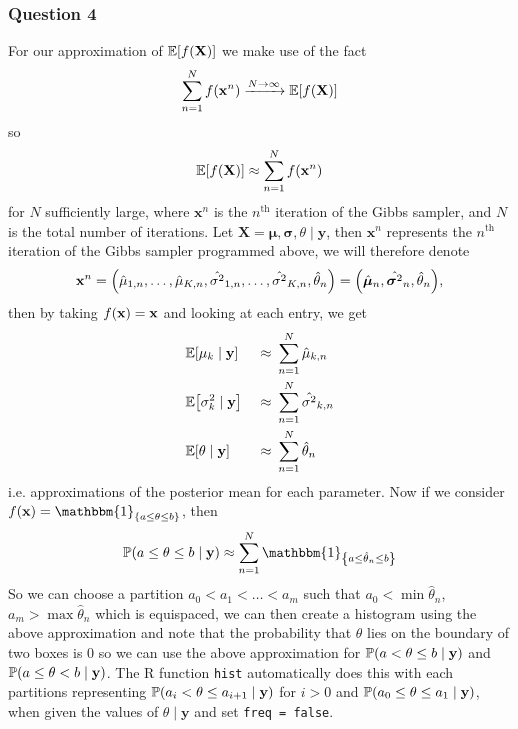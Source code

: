 \documentclass[11pt]{article} %
\let\originalleft\left
\let\originalright\right
\renewcommand{\left}{\mathopen{}\mathclose\bgroup\originalleft}
\renewcommand{\right}{\aftergroup\egroup\originalright}
\begin{document}
\subsubsection*{Question 4}
For our approximation of $\mathbb{E}\left[f\left(\mathbf{X}\right)\right]$ we make use of the fact
\begin{equation*}
	\sum_{n=1}^{N}{f\left(\mathbf{x}^n\right)} \xrightarrow{N \to \infty} \mathbb{E}\left[f\left(\mathbf{X}\right)\right]
\end{equation*}
so
\begin{equation}
	\mathbb{E}\left[f\left(\mathbf{X}\right)\right] \approx \sum_{n=1}^{N}{f\left(\mathbf{x}^n\right)} \label{eq:1}
\end{equation}
for $N$ sufficiently large, where $\mathbf{x}^n$ is the $n^{\text{th}}$ iteration of the Gibbs sampler, and $N$ is the total number of iterations. Let $\mathbf{X} = \boldsymbol{\mu}, \boldsymbol{\sigma}, \theta \mid \mathbf{y}$, then $\mathbf{x}^n$ represents the $n^{\text{th}}$ iteration of the Gibbs sampler programmed above, we will therefore denote 
$$\mathbf{x}^n = \left(\hat{\mu}_{1, n},\ldots , \hat{\mu}_{K, n}, \hat{\sigma^2}_{1, n},\ldots , \hat{\sigma^2}_{K, n}, \hat{\theta}_n\right) = \left(\hat{\boldsymbol{\mu}}_n, \hat{\boldsymbol{\sigma}^2}_n, \hat{\theta}_n\right),$$
then by taking $f\left(\mathbf{x}\right) = \mathbf{x}$ and looking at each entry, we get
\begin{alignat*}{2}
	& \mathbb{E}\left[\mu_k\mid\mathbf{y}\right] &\ \approx\ & \sum_{n=1}^{N}{\hat{\mu}_{k, n}} \\
	& \mathbb{E}\left[\sigma^2_k\mid\mathbf{y}\right] &\ \approx\ & \sum_{n=1}^{N}{\hat{\sigma^2}_{k, n}} \\
	& \mathbb{E}\left[\theta\mid\mathbf{y}\right] &\ \approx\ & \sum_{n=1}^{N}{\hat{\theta}_n} 
\end{alignat*}
i.e. approximations of the posterior mean for each parameter. Now if we consider $f\left(\mathbf{x}\right) = \mathbbm{1}_{\left\{a \leq \theta \leq b \right\}}$, then
$$\mathbb{P}\left(a \leq \theta \leq b \mid \mathbf{y} \right) \approx \sum_{n=1}^{N}{\mathbbm{1}_{\left\{a \leq \hat{\theta}_n \leq b \right\}}}$$
So we can choose a partition $a_0 < a_1 < \ldots < a_m$ such that $a_0 < \min{\hat{\theta}_n}$, $a_m > \max{\hat{\theta}_n}$ which is equispaced, we can then create a histogram using the above approximation and note that the probability that $\theta$ lies on the boundary of two boxes is $0$ so we can use the above approximation for $\mathbb{P}\left(a < \theta \leq b \mid \mathbf{y} \right)$ and $\mathbb{P}\left(a \leq \theta < b \mid \mathbf{y} \right)$. The R function \verb|hist| automatically does this with each partitions representing $ \mathbb{P}\left(a_i < \theta \leq a_{i+1} \mid \mathbf{y} \right) $ for $i > 0$ and $ \mathbb{P}\left(a_0 \leq \theta \leq a_1 \mid \mathbf{y} \right) $, when given the values of $\theta \mid \mathbf{y}$ and set \verb|freq = false|.\\
\end{document}
